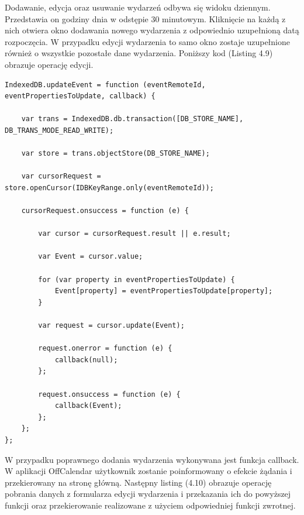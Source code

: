 Dodawanie, edycja oraz usuwanie wydarzeń odbywa się widoku dziennym. Przedstawia on godziny dnia w odstępie 30 minutowym. Kliknięcie na każdą z nich otwiera okno dodawania nowego wydarzenia z odpowiednio uzupełnioną datą rozpoczęcia. W przypadku edycji wydarzenia to samo okno zostaje uzupełnione również o wszystkie pozostałe dane wydarzenia. Poniższy kod (Listing 4.9) obrazuje operację edycji.

\begin{lstlisting}[style=js, caption=Edycja wydarzenia cz. 1., label=amb, captionpos=b]
IndexedDB.updateEvent = function (eventRemoteId, eventPropertiesToUpdate, callback) {

    var trans = IndexedDB.db.transaction([DB_STORE_NAME], DB_TRANS_MODE_READ_WRITE);

    var store = trans.objectStore(DB_STORE_NAME);

    var cursorRequest = store.openCursor(IDBKeyRange.only(eventRemoteId));

    cursorRequest.onsuccess = function (e) {

        var cursor = cursorRequest.result || e.result;

        var Event = cursor.value;

        for (var property in eventPropertiesToUpdate) {
            Event[property] = eventPropertiesToUpdate[property];
        }

        var request = cursor.update(Event);

        request.onerror = function (e) {
            callback(null);
        };

        request.onsuccess = function (e) {
            callback(Event);
        };
    };
};
\end{lstlisting}

W przypadku poprawnego dodania wydarzenia wykonywana jest funkcja callback. W aplikacji \mbox{OffCalendar} użytkownik zostanie poinformowany o efekcie żądania i przekierowany na stronę główną. Następny listing (4.10) obrazuje operację pobrania danych z formularza edycji wydarzenia i przekazania ich do powyższej funkcji oraz przekierowanie realizowane z użyciem odpowiedniej funkcji zwrotnej.

